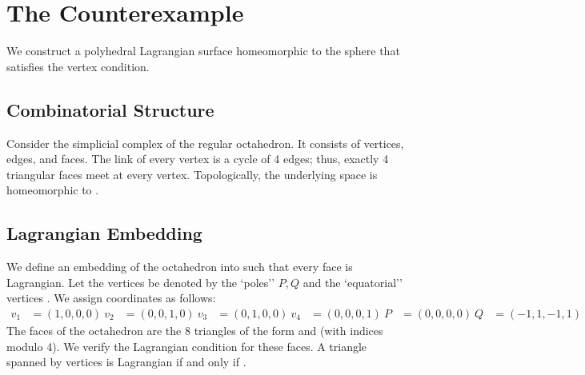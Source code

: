 \documentclass[11pt]{article}
\theoremstyle{definition}
\begin{document}
\section{The Counterexample}

We construct a polyhedral Lagrangian surface  homeomorphic to the sphere  that satisfies the vertex condition.

\subsection{Combinatorial Structure}
Consider the simplicial complex of the regular octahedron. It consists of  vertices,  edges, and  faces. The link of every vertex is a cycle of 4 edges; thus, exactly 4 triangular faces meet at every vertex. Topologically, the underlying space is homeomorphic to .

\subsection{Lagrangian Embedding}
We define an embedding of the octahedron into  such that every face is Lagrangian. Let the vertices be denoted by the `poles'' $P, Q$ and the `equatorial'' vertices .
We assign coordinates as follows:
\begin{align*}
v_1 &= (1, 0, 0, 0) \
v_2 &= (0, 0, 1, 0) \
v_3 &= (0, 1, 0, 0) \
v_4 &= (0, 0, 0, 1) \
P   &= (0, 0, 0, 0) \
Q   &= (-1, 1, -1, 1)
\end{align*}
The faces of the octahedron are the 8 triangles of the form  and  (with indices modulo 4). We verify the Lagrangian condition for these faces. A triangle spanned by vertices  is Lagrangian if and only if .
\end{document}
